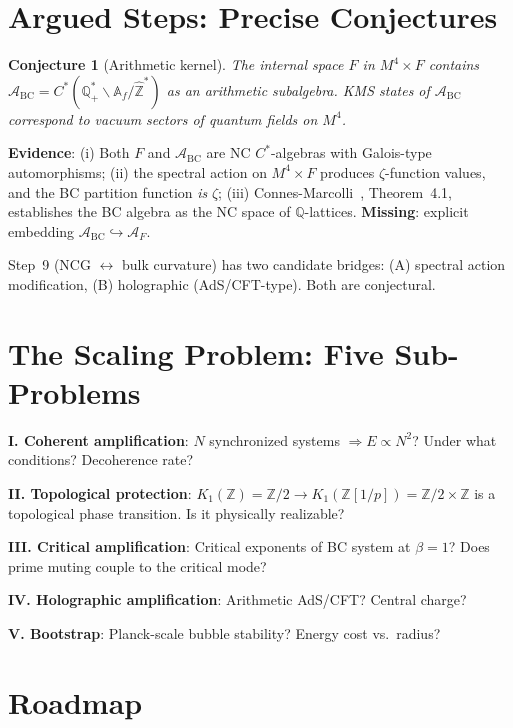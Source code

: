\documentclass[11pt,a4paper]{article}
\newtheorem{conjecture}[theorem]{Conjecture}
\newcommand{\Zp}{\mathbb{Z}[1/p]}
\newcommand{\Zhat}{\hat{\mathbb{Z}}}
\begin{document}
\section{Argued Steps: Precise Conjectures}

\begin{conjecture}[Arithmetic kernel]
\label{conj:kernel}
The internal space $F$ in $M^4 \times F$ contains
$\mathcal{A}_{\mathrm{BC}} = C^*(\mathbb{Q}_+^* \backslash \mathbb{A}_f / \Zhat^*)$
as an arithmetic subalgebra. KMS states of $\mathcal{A}_{\mathrm{BC}}$
correspond to vacuum sectors of quantum fields on $M^4$.
\end{conjecture}

\textbf{Evidence}: (i) Both $F$ and $\mathcal{A}_{\mathrm{BC}}$ are
NC $C^*$-algebras with Galois-type automorphisms;
(ii) the spectral action on $M^4\times F$ produces $\zeta$-function
values, and the BC partition function \emph{is} $\zeta$;
(iii) Connes-Marcolli~\cite{ConnesMarcolli2006}, Theorem~4.1,
establishes the BC algebra as the NC space of $\mathbb{Q}$-lattices.
\textbf{Missing}: explicit embedding $\mathcal{A}_{\mathrm{BC}} \hookrightarrow \mathcal{A}_F$.

Step~9 (NCG $\leftrightarrow$ bulk curvature) has two candidate bridges:
(A) spectral action modification, (B) holographic (AdS/CFT-type).
Both are conjectural.

\section{The Scaling Problem: Five Sub-Problems}

\textbf{I. Coherent amplification}: $N$ synchronized systems $\Rightarrow E \propto N^2$?
Under what conditions? Decoherence rate?

\textbf{II. Topological protection}:
$K_1(\mathbb{Z}) = \mathbb{Z}/2 \to K_1(\Zp) = \mathbb{Z}/2 \times \mathbb{Z}$
is a topological phase transition. Is it physically realizable?

\textbf{III. Critical amplification}: Critical exponents of BC system at $\beta = 1$?
Does prime muting couple to the critical mode?

\textbf{IV. Holographic amplification}: Arithmetic AdS/CFT?
Central charge?

\textbf{V. Bootstrap}: Planck-scale bubble stability?
Energy cost vs.\ radius?

\section{Roadmap}
\end{document}
